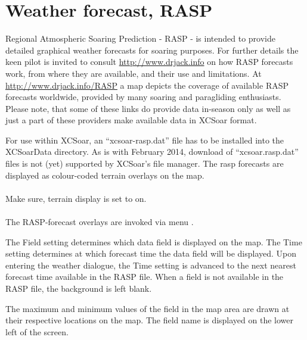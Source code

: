 \section{Weather forecast, RASP}\label{sec:weather-forecast}

Regional Atmospheric Soaring Prediction - RASP - is intended to provide 
detailed graphical weather forecasts for soaring purposes. For further details 
the keen pilot is invited to consult \url{http://www.drjack.info} on how RASP 
forecasts work, from where they are available, and their use and limitations. 
At \url{http://www.drjack.info/RASP} a map depicts the coverage of available 
RASP forecasts worldwide, provided by many soaring and paragliding enthusiasts. 
Please note, that some of these links do provide data in-season only as well 
as just a part of these providers make available data in XCSoar format.

For use within XCSoar, an ``xcsoar-rasp.dat'' file has to be installed 
into the XCSoarData directory.  As is with February 2014, download of 
``xcsoar.rasp.dat'' files is not (yet) supported by XCSoar's file manager. The 
rasp forecasts are displayed as colour-coded terrain overlays on the map. \\ \\
Make sure, terrain display is set to on. \tip{} \\ \\
The RASP-forecast overlays are invoked via menu 
.

The Field setting determines which data field is displayed on the map.
The Time setting determines at which forecast time the data field will
be displayed.  Upon entering the weather dialogue, the Time setting is
advanced to the next nearest forecast time available in the RASP file.
When a field is not available in the RASP file, the background is left blank.

The maximum and minimum values of the field in the map area are drawn
at their respective locations on the map.  The field name is displayed
on the lower left of the screen.

